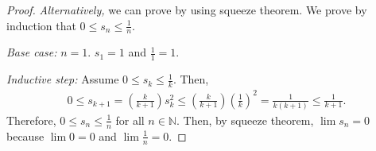 \documentclass{article}
\begin{document}
\begin{enumerate}
\begin{proof}
        \emph{Alternatively,} we can prove by using squeeze theorem. We prove by induction that
        $0\le s_n\le\frac{1}{n}$.

        \emph{Base case:} $n=1$. $s_1=1$ and $\frac{1}{1}=1$.

        \emph{Inductive step:} Assume $0\le s_k\le\frac{1}{k}$. Then,
        \begin{align*}
            0 \le s_{k+1} 
            = \left(\frac{k}{k+1}\right)s_k^2 
            \le \left(\frac{k}{k+1}\right)\left(\frac{1}{k}\right)^2 
            = \frac{1}{k(k+1)} \le \frac{1}{k+1}.
        \end{align*}
        Therefore, $0\le s_n\le\frac{1}{n}$ for all $n\in\mathbb{N}$. Then, by squeeze theorem,
        $\lim s_n=0$ because $\lim 0 = 0$ and $\lim \frac{1}{n} = 0$.
    \end{proof}

    \end{enumerate}
\end{document}
